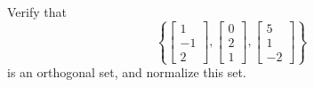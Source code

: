 \documentclass[pdf,9pt]{beamer}
\begin{document}
\begin{frame}[fragile]
\begin{center}
   \end{center}
\end{frame}
\begin{frame}[fragile]
\begin{problem}
    Verify that
    \[ \left\{
      \left[\begin{array}{r} 1 \\ -1 \\ 2 \end{array}\right],
      \left[\begin{array}{r} 0 \\ 2 \\ 1  \end{array}\right],
      \left[\begin{array}{r} 5 \\ 1 \\ -2 \end{array}\right]
    \right\} \]
    is an orthogonal set, and normalize this set.
\end{problem}
\end{frame}
\end{document}

